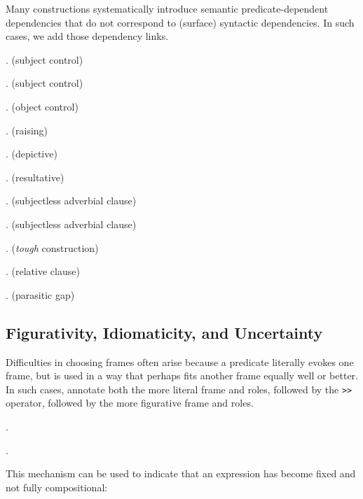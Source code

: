 \documentclass[a4paper]{article}
\begin{document}
Many constructions systematically introduce semantic predicate-dependent
dependencies that do not correspond to (surface) syntactic dependencies. In such cases, we add those dependency links.

\ex. (subject control)

\ex. (subject control)

\ex. (object control)

\ex. (raising)

\ex. (depictive)

\ex. (resultative)

\ex. (subjectless adverbial clause)

\ex. (subjectless adverbial clause)

\ex. (\emph{tough} construction)

\ex. (relative clause)

\ex. (parasitic gap)

\newpage\subsection{Figurativity, Idiomaticity, and Uncertainty}

Difficulties in choosing frames often arise because a predicate literally evokes
one frame, but is used in a way that perhaps fits another frame equally well or
better. In such cases, annotate both the more literal frame and roles, followed
by the \texttt{>}\texttt{>} operator, followed by the more figurative frame and
roles.

\ex.

\ex.

This mechanism can be used to indicate that an expression has become fixed and
not fully compositional:
\end{document}
